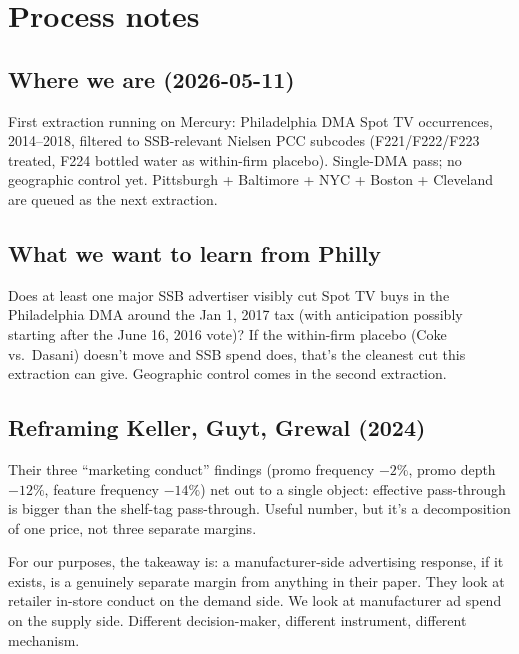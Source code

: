 
\section*{Process notes}

\subsection*{Where we are (2026-05-11)}

First extraction running on Mercury: Philadelphia DMA Spot
TV occurrences, 2014--2018, filtered to SSB-relevant Nielsen
PCC subcodes (F221/F222/F223 treated, F224 bottled water as
within-firm placebo). Single-DMA pass; no geographic control
yet. Pittsburgh + Baltimore + NYC + Boston + Cleveland are
queued as the next extraction.

\subsection*{What we want to learn from Philly}

Does at least one major SSB advertiser visibly cut Spot TV
buys in the Philadelphia DMA around the Jan 1, 2017 tax
(with anticipation possibly starting after the June 16,
2016 vote)? If the within-firm placebo (Coke vs.\ Dasani)
doesn't move and SSB spend does, that's the cleanest cut
this extraction can give. Geographic control comes in the
second extraction.

\subsection*{Reframing Keller, Guyt, Grewal (2024)}

Their three ``marketing conduct'' findings (promo frequency
$-2\%$, promo depth $-12\%$, feature frequency $-14\%$) net
out to a single object: effective pass-through is bigger
than the shelf-tag pass-through. Useful number, but it's a
decomposition of one price, not three separate margins.

For our purposes, the takeaway is: a manufacturer-side
advertising response, if it exists, is a genuinely separate
margin from anything in their paper. They look at retailer
in-store conduct on the demand side. We look at manufacturer
ad spend on the supply side. Different decision-maker,
different instrument, different mechanism.

